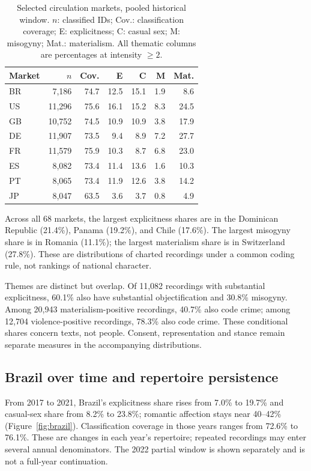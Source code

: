 \documentclass[10pt,a4paper,twocolumn]{article}
\begin{document}
\begin{table}[t]
\caption{Selected circulation markets, pooled historical window. $n$: classified IDs; Cov.: classification coverage; E: explicitness; C: casual sex; M: misogyny; Mat.: materialism. All thematic columns are percentages at intensity $\geq2$.}
\label{tab:markets}
\centering\footnotesize\setlength{\tabcolsep}{3.5pt}
\begin{tabular}{@{}lrrrrrr@{}}
\toprule Market & $n$ & Cov. & E & C & M & Mat.\\
\midrule
BR & 7,186 & 74.7 & 12.5 & 15.1 & 1.9 & 8.6 \\
US & 11,296 & 75.6 & 16.1 & 15.2 & 8.3 & 24.5 \\
GB & 10,752 & 74.5 & 10.9 & 10.9 & 3.8 & 17.9 \\
DE & 11,907 & 73.5 & 9.4 & 8.9 & 7.2 & 27.7 \\
FR & 11,579 & 75.9 & 10.3 & 8.7 & 6.8 & 23.0 \\
ES & 8,082 & 73.4 & 11.4 & 13.6 & 1.6 & 10.3 \\
PT & 8,065 & 73.4 & 11.9 & 12.6 & 3.8 & 14.2 \\
JP & 8,047 & 63.5 & 3.6 & 3.7 & 0.8 & 4.9 \\
\bottomrule
\end{tabular}
\end{table}

Across all 68 markets, the largest explicitness shares are in the Dominican Republic (21.4\%), Panama (19.2\%), and Chile (17.6\%). The largest misogyny share is in Romania (11.1\%); the largest materialism share is in Switzerland (27.8\%). These are distributions of charted recordings under a common coding rule, not rankings of national character.

Themes are distinct but overlap. Of 11,082 recordings with substantial explicitness, 60.1\% also have substantial objectification and 30.8\% misogyny. Among 20,943 materialism-positive recordings, 40.7\% also code crime; among 12,704 violence-positive recordings, 78.3\% also code crime. These conditional shares concern texts, not people. Consent, representation and stance remain separate measures in the accompanying distributions.

\subsection{Brazil over time and repertoire persistence}
From 2017 to 2021, Brazil's explicitness share rises from 7.0\% to 19.7\% and casual-sex share from 8.2\% to 23.8\%; romantic affection stays near 40--42\% (Figure~\ref{fig:brazil}). Classification coverage in those years ranges from 72.6\% to 76.1\%. These are changes in each year's repertoire; repeated recordings may enter several annual denominators. The 2022 partial window is shown separately and is not a full-year continuation.
\end{document}
